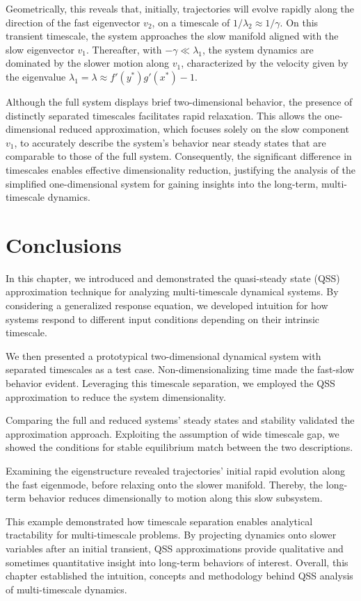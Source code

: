 Geometrically, this reveals that, initially, trajectories will evolve rapidly along the direction of the fast eigenvector $v_2$, on a timescale of $1/\lambda_2 \approx 1/\gamma$. On this transient timescale, the system approaches the slow manifold aligned with the slow eigenvector $v_1$. Thereafter, with $-\gamma \ll \lambda_1$, the system dynamics are dominated by the slower motion along $v_1$, characterized by the velocity given by the eigenvalue $\lambda_1 = \lambda \approx f'(y^*)g'(x^*)-1$.

Although the full system displays brief two-dimensional behavior, the presence of distinctly separated timescales facilitates rapid relaxation. This allows the one-dimensional reduced approximation, which focuses solely on the slow component $v_1$, to accurately describe the system's behavior near steady states that are comparable to those of the full system. Consequently, the significant difference in timescales enables effective dimensionality reduction, justifying the analysis of the simplified one-dimensional system for gaining insights into the long-term, multi-timescale dynamics.

\section{Conclusions}

In this chapter, we introduced and demonstrated the quasi-steady state (QSS) approximation technique for analyzing multi-timescale dynamical systems. By considering a generalized response equation, we developed intuition for how systems respond to different input conditions depending on their intrinsic timescale.

We then presented a prototypical two-dimensional dynamical system with separated timescales as a test case. Non-dimensionalizing time made the fast-slow behavior evident. Leveraging this timescale separation, we employed the QSS approximation to reduce the system dimensionality.

Comparing the full and reduced systems' steady states and stability validated the approximation approach. Exploiting the assumption of wide timescale gap, we showed the conditions for stable equilibrium match between the two descriptions.

Examining the eigenstructure revealed trajectories' initial rapid evolution along the fast eigenmode, before relaxing onto the slower manifold. Thereby, the long-term behavior reduces dimensionally to motion along this slow subsystem.

This example demonstrated how timescale separation enables analytical tractability for multi-timescale problems. By projecting dynamics onto slower variables after an initial transient, QSS approximations provide qualitative and sometimes quantitative insight into long-term behaviors of interest. Overall, this chapter established the intuition, concepts and methodology behind QSS analysis of multi-timescale dynamics.